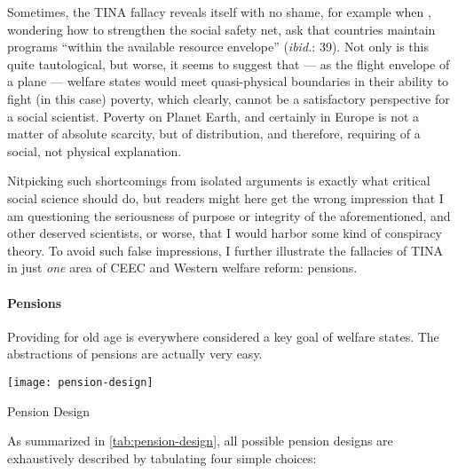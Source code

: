 Sometimes, the TINA fallacy reveals itself with no shame, for example when \cite{Grow2005}, wondering how to strengthen the social safety net, ask that countries maintain programs ``within the available resource envelope'' (\emph{ibid.}: 39). Not only is this quite tautological, but worse, it seems to suggest that --- as the flight envelope of a plane --- welfare states would meet quasi-physical boundaries in their ability to fight (in this case) poverty, which clearly, cannot be a satisfactory perspective for a social scientist. Poverty on Planet Earth, and certainly in Europe is not a matter of absolute scarcity, but of distribution, and therefore, requiring of a social, not physical explanation.

Nitpicking such shortcomings from isolated arguments is exactly what critical social science should do, but readers might here get the wrong impression that I am questioning the seriousness of purpose or integrity of the aforementioned, and other deserved scientists, or worse, that I would harbor some kind of conspiracy theory. To avoid such false impressions, I further illustrate the fallacies of TINA in just \emph{one} area of \gls{CEEC} and Western welfare reform: pensions. %

\paragraph{Pensions}  \label{sec:pensions}
Providing for old age is everywhere considered a key goal of welfare states. The abstractions of pensions are actually very easy. 

 \begin{table}[htbp]
	\centering
	\texttt{[image: pension-design]}  
	\caption{Pension Design}
	\label{tab:pension-design}
\end{table}%

As summarized in \autoref{tab:pension-design}, all possible pension designs are exhaustively described by tabulating four simple choices:

